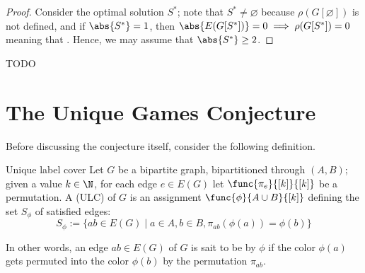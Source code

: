 \documentclass[a4paper, 12pt]{report}
\begin{document}
    \begin{proof}
        Consider the optimal solution $S^*$; note that $S^* \neq \varnothing$ because $\rho(G[\varnothing])$ is not defined, and if $\abs{S^*} = 1$, then $\abs{E(G[S^*])} = 0 \implies \rho(G[S^*]) = 0$ meaning that . Hence, we may assume that $\abs{S^*} \ge 2$.
        
    \end{proof}

    TODO 

    \section{The Unique Games Conjecture}

    Before discussing the conjecture itself, consider the following definition.

    \begin{frameddefn}{Unique label cover}
        Let $G$ be a bipartite graph, bipartitioned through $(A, B)$; given a value $k \in \N$, for each edge $e \in E(G)$ let $\func{\pi_e}{[k]}{[k]}$ be a permutation. A  (ULC) of $G$ is an assignment $\func{\phi}{A \cup B}{[k]}$ defining the set $S_\phi$ of satisfied edges: $$S_\phi := \{ab \in E(G) \mid a \in A, b \in B, \pi_{ab}(\phi(a)) = \phi(b)\}$$
    \end{frameddefn}

    In other words, an edge $ab \in E(G)$ of $G$ is sait to be  by $\phi$ if the color $\phi(a)$ gets permuted into the color $\phi(b)$ by the permutation $\pi_{ab}$.

\end{document}
